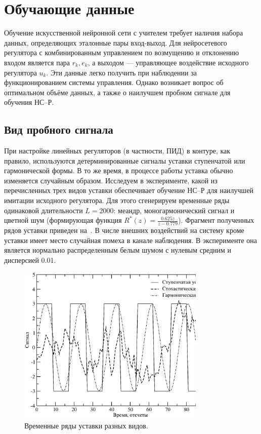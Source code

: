 \section{Обучающие данные}

Обучение искусственной нейронной сети с учителем требует наличия
набора данных, определяющих эталонные пары вход-выход.  Для
нейросетевого регулятора с комбинированным управлением по возмущению и
отклонению входом является пара $r_k,e_k$, а выходом --- управляющее
воздействие исходного регулятора $u_k$.  Эти данные легко получить при
наблюдении за функционированием системы управления.  Однако возникает
вопрос об оптимальном объёме данных, а также о наилучшем пробном
сигнале для обучения НС--Р.

\subsection{Вид пробного сигнала}

При настройке линейных регуляторов (в частности, ПИД) в контуре, как
правило, используются детерминированные сигналы уставки ступенчатой
или гармонической формы.  В то же время, в процессе работы уставка
обычно изменяется случайным образом.  Исследуем в эксперименте, какой
из перечисленных трех видов уставки обеспечивает обучение НС--Р для
наилучшей имитации исходного регулятора.  Для этого сгенерируем
временные ряды одинаковой длительности $L=2000$: меандр,
моногармонический сигнал и цветной шум (формирующая функция
$R^*(z)=\frac{0.625z}{z-0.779}$).  Фрагмент полученных рядов уставки
приведен на~.  В числе внешних воздействий
на систему кроме уставки имеет место случайная помеха в канале
наблюдения.  В эксперименте она является нормально распределенным
белым шумом с нулевым средним и дисперсией 0.01.

\begin{figure}
\centering
\includegraphics[width=0.8\textwidth,%
  totalheight=0.35\textheight]{probe_signals_rus}
\caption{Временные ряды уставки разных видов.}\label{fig:probe_signals}
\end{figure}

